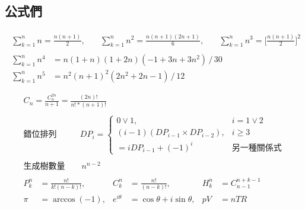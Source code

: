 \documentclass[a4paper,10pt,twocolumn,oneside]{article}
\begin{document}
\subsection{公式們}
\begin{gather*}
  \begin{aligned}
    \sum_{k=1}^{n} n = \frac{n (n+1)}{2}, \quad          &
    \sum_{k=1}^{n} n^2 = \frac{n (n+1) (2n+1)}{6}, \quad &
    \sum_{k=1}^{n} n^3 = \bigg[ \frac{n (n+1)}{2} \bigg]^2
  \end{aligned}  \\
  \begin{aligned}
    \sum_{k=1}^{n} n^4 & = n (1+n) (1+2n) (-1 + 3n + 3n^2) \,/\, 30 \\
    \sum_{k=1}^{n} n^5 & = n^2 (n+1)^2 (2n^2+2n-1) \,/\, 12
  \end{aligned}  \\
\end{gather*}
\begin{gather*}
  \begin{aligned}
    C_n = \frac{C^{2n}_{n}}{n+1} = \frac{(2n)!}{n! * (n+1)!}
  \end{aligned}  \\
  \begin{aligned}
    \textrm{錯位排列} \qquad &
    DP_i = \begin{cases}
             0 \lor 1,                          & i = 1 \lor 2    \\
             (i - 1)(DP_{i-1} \times DP_{i-2}), & i \geq 3        \\
             = i DP_{i-1} + (-1)^i              & \textrm{另一種關係式}
           \end{cases}
  \end{aligned}  \\
  \begin{aligned}
    \textrm{生成樹數量} \qquad n^{n-2}
  \end{aligned}  \\
  \begin{aligned}
    P_{k}^{n}   & = \frac{n!}{k!(n-k)!},         &
    C_{k}^{n}   & = \frac{n!}{(n-k)!},           &
    H_{k}^{n}   & = C_{n - 1}^{n + k -1}           \\
    \pi         & = \arccos(-1),                 &
    e^{i\theta} & = \cos \theta + i \sin \theta, &
    pV          & = nTR
  \end{aligned}  \\
\end{gather*}
\end{document}
